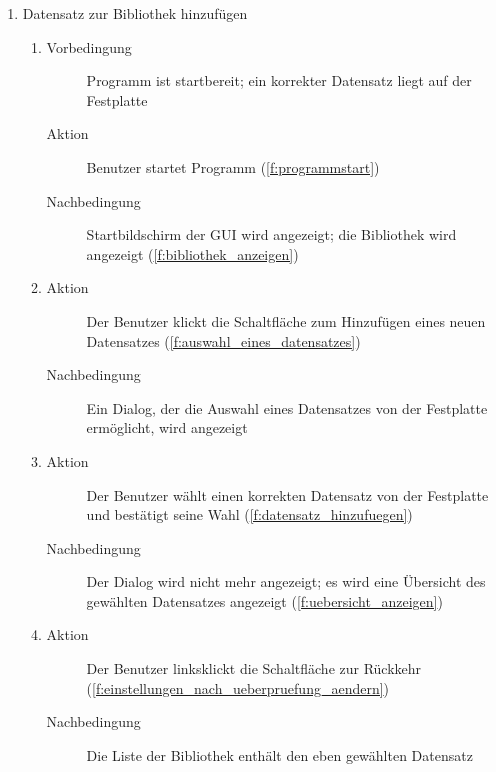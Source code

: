 \begin{enumerate} [label=\bfseries /TS \arabic*0/, leftmargin=*]
	\item Datensatz zur Bibliothek hinzufügen \label{ts:datensatz_hinzufuegen}
	\begin{enumerate}[leftmargin=0pt]
		\item
		\begin{description}
			\item[Vorbedingung] Programm ist startbereit; ein korrekter Datensatz liegt auf der Festplatte %
			\item[Aktion] Benutzer startet Programm (\ref{f:programmstart})
			\item[Nachbedingung] Startbildschirm der \gls{GUI} wird angezeigt; die Bibliothek wird angezeigt (\ref{f:bibliothek_anzeigen})
		\end{description}
		\item
		\begin{description}
			\item[Aktion] Der Benutzer klickt die Schaltfläche zum Hinzufügen eines neuen Datensatzes (\ref{f:auswahl_eines_datensatzes})
			\item[Nachbedingung] Ein \gls{Dialog}, der die Auswahl eines Datensatzes von der Festplatte ermöglicht, wird angezeigt
		\end{description}
		\item
		\begin{description}
			\item[Aktion] Der Benutzer wählt einen korrekten Datensatz von der Festplatte und bestätigt seine Wahl (\ref{f:datensatz_hinzufuegen})
			\item[Nachbedingung] Der \gls{Dialog} wird nicht mehr angezeigt; es wird eine Übersicht des gewählten Datensatzes angezeigt (\ref{f:uebersicht_anzeigen})
		\end{description}
		\item
		\begin{description}
			\item[Aktion] Der Benutzer linksklickt die Schaltfläche zur Rückkehr (\ref{f:einstellungen_nach_ueberpruefung_aendern})
			\item[Nachbedingung] Die Liste der Bibliothek enthält den eben gewählten Datensatz
		\end{description}
	\end{enumerate}


\end{enumerate}
